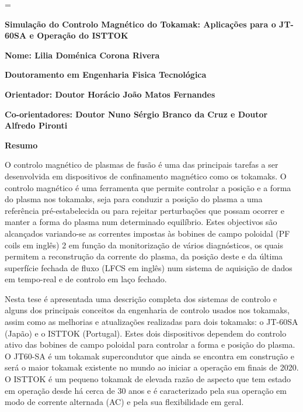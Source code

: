





\usepackage{enumitem}
\usepackage{notoccite}
\usepackage{longtable}
\usepackage{multirow}
\usepackage{lipsum}
\usepackage{xcolor,colortbl}
\usepackage{mathtools}

\DeclareMathOperator*{\argmin}{arg\,min}
\DeclareMathOperator{\dist}{\mathit{dist}}


	\emergencystretch=\maxdimen
	
	{\fontsize{12}{12}\selectfont \textbf{ Simulação do Controlo Magnético do Tokamak: Aplicações para o JT-60SA e Operação do ISTTOK}}
	
	\bigskip
		
		
\textbf{Nome:	Lilia Doménica Corona Rivera}
	\smallskip
	
\textbf{	Doutoramento em Engenharia Fisica Tecnológica}
	\smallskip

	
\textbf{	Orientador: \quad Doutor Horácio João Matos Fernandes}
	\smallskip
	
\textbf{	Co-orientadores: \quad Doutor Nuno Sérgio Branco da Cruz e Doutor Alfredo Pironti}
\smallskip

\setlength{\parskip}{1em}

	
	\textbf{Resumo}
	\smallskip
	
O  controlo magnético de plasmas de fusão é uma das principais tarefas a ser desenvolvida em dispositivos de confinamento magnético como os tokamaks. O controlo magnético é uma ferramenta que permite controlar a posição e a forma do plasma nos tokamaks, seja para conduzir a posição do plasma a uma referência pré-estabelecida ou para rejeitar perturbações que possam ocorrer e manter a forma do plasma num determinado equilíbrio. Estes objectivos são alcançados variando-se as correntes impostas às bobines de campo poloidal (PF coils em inglês) 2 em função da monitorização de vários diagnósticos, os quais permitem a reconstrução da corrente do plasma, da posição deste e da última superfície fechada de fluxo (LFCS em inglês) num sistema de aquisição de dados em tempo-real e de controlo em laço fechado. \smallskip

Nesta tese é apresentada uma descrição completa dos sistemas de controlo e alguns dos principais conceitos da engenharia de controlo usados nos tokamaks, assim como as melhorias e atualizações realizadas para dois tokamaks: o JT-60SA (Japão) e o ISTTOK (Portugal). Estes dois dispositivos dependem do controlo ativo das bobines de campo poloidal para controlar a forma e posição do plasma. O JT60-SA é um tokamak supercondutor que ainda se encontra em construção e será o maior tokamak existente no mundo ao iniciar a operação em finais de 2020. O ISTTOK é um pequeno tokamak de elevada razão de aspecto que tem estado em operação desde há cerca de 30 anos e é caracterizado pela sua operação em modo de corrente alternada (AC) e pela sua flexibilidade em geral.\smallskip

